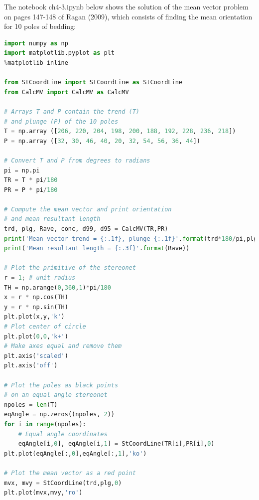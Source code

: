 \documentclass[a4paper , 12pt]{book}
\begin{document}
The notebook ch4-3.ipynb below shows the solution of the mean vector problem on pages 147-148 of Ragan (2009), which consists of finding the mean orientation for 10 poles of bedding:

\begin{center}
\begin{lstlisting}[language=Python, frame=single]
import numpy as np
import matplotlib.pyplot as plt
%matplotlib inline

from StCoordLine import StCoordLine as StCoordLine
from CalcMV import CalcMV as CalcMV 

# Arrays T and P contain the trend (T) 
# and plunge (P) of the 10 poles
T = np.array ([206, 220, 204, 198, 200, 188, 192, 228, 236, 218])
P = np.array ([32, 30, 46, 40, 20, 32, 54, 56, 36, 44])

# Convert T and P from degrees to radians
pi = np.pi
TR = T * pi/180
PR = P * pi/180

# Compute the mean vector and print orientation
# and mean resultant length
trd, plg, Rave, conc, d99, d95 = CalcMV(TR,PR)
print('Mean vector trend = {:.1f}, plunge {:.1f}'.format(trd*180/pi,plg*180/pi))
print('Mean resultant length = {:.3f}'.format(Rave))

# Plot the primitive of the stereonet
r = 1; # unit radius
TH = np.arange(0,360,1)*pi/180
x = r * np.cos(TH)
y = r * np.sin(TH)
plt.plot(x,y,'k')
# Plot center of circle
plt.plot(0,0,'k+')
# Make axes equal and remove them
plt.axis('scaled')
plt.axis('off')

# Plot the poles as black points
# on an equal angle stereonet
npoles = len(T)
eqAngle = np.zeros((npoles, 2))
for i in range(npoles):
    # Equal angle coordinates
    eqAngle[i,0], eqAngle[i,1] = StCoordLine(TR[i],PR[i],0)
plt.plot(eqAngle[:,0],eqAngle[:,1],'ko')

# Plot the mean vector as a red point
mvx, mvy = StCoordLine(trd,plg,0)
plt.plot(mvx,mvy,'ro')
\end{lstlisting}
\end{center}
\end{document}

